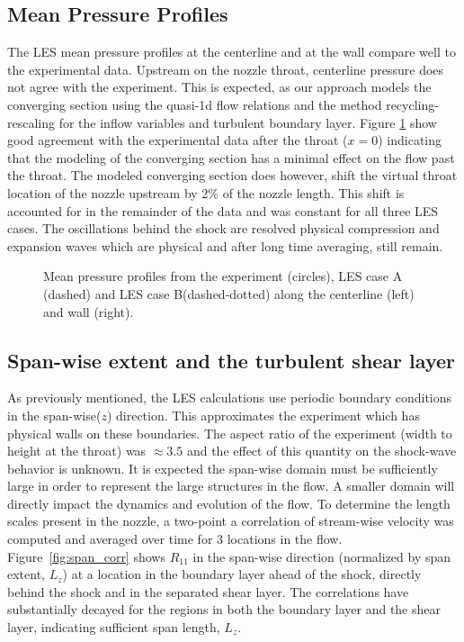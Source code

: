 \documentclass[]{aiaa-tc}%
\begin{document}
\clearpage
\subsection{Mean Pressure Profiles}
The LES mean pressure profiles at the centerline and at the wall compare well to the experimental data.  Upstream on the nozzle throat, centerline pressure does not agree with the experiment.  This is expected, as our approach models the converging section using the quasi-1d flow relations and the method recycling-rescaling for the inflow variables and turbulent boundary layer.  Figure \ref{fig:P_prof} show good agreement with the experimental data after the throat ($x=0$) indicating that the modeling of the converging section has a minimal effect on the flow past the throat.  The modeled converging section does however, shift the virtual throat location of the nozzle upstream by 2\% of the nozzle length.  This shift is accounted for in the remainder of the data and was constant for all three LES cases.  The oscillations behind the shock are resolved physical compression and expansion waves which are physical and after long time averaging, still remain.

\begin{figure}[!ht]
	\caption{ Mean pressure profiles from the experiment (circles),  LES case A (dashed) and LES case B(dashed-dotted) along the centerline (left) and wall (right). 
	\label{fig:P_prof}
	}
\end{figure}


\subsection{Span-wise extent and the turbulent shear layer }
As previously mentioned, the LES calculations use periodic boundary conditions in the span-wise($z$) direction.  This approximates the experiment which has physical walls on these boundaries.  The aspect ratio of the experiment (width to height at the throat) was $\approx 3.5$ and the effect of this quantity on the shock-wave behavior is unknown.  It is expected the span-wise domain must be sufficiently large in order to represent the large structures in the flow.  A smaller domain will directly impact the dynamics and evolution of the flow.  To determine the length scales present in the nozzle, a two-point a correlation of stream-wise velocity was computed and averaged over time for 3 locations in the flow.  Figure~\ref{fig:span_corr} shows $R_{11}$ in the span-wise direction (normalized by span extent, $L_z$) at a location in the boundary layer ahead of the shock, directly behind the shock and in the separated shear layer.  The correlations have substantially decayed for the regions in both the boundary layer and the shear layer, indicating sufficient span length, $L_z$.
\end{document}
